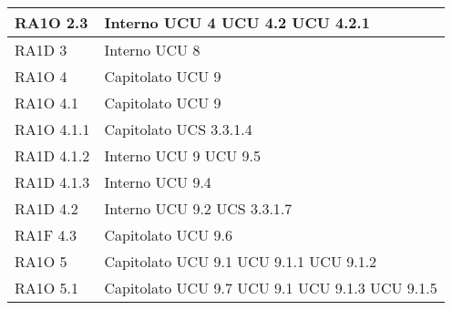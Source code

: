 \begin{center}
\begin{longtable}{ | p{5cm} | p{5cm} |}
        RA1O 2.3 &  Interno \newline  UCU 4 \newline  UCU 4.2 \newline  UCU 4.2.1 \newline  \\ \hline      
        RA1D 3 &  Interno \newline  UCU 8 \newline  \\ \hline      
        RA1O 4 &  Capitolato \newline  UCU 9 \newline  \\ \hline      
        RA1O 4.1 &  Capitolato \newline  UCU 9 \newline  \\ \hline      
        RA1O 4.1.1 &  Capitolato \newline  UCS 3.3.1.4 \newline  \\ \hline      
        RA1D 4.1.2 &  Interno \newline  UCU 9 \newline  UCU 9.5 \newline  \\ \hline      
        RA1D 4.1.3 &  Interno \newline  UCU 9.4 \newline  \\ \hline      
        RA1D 4.2 &  Interno \newline  UCU 9.2 \newline  UCS 3.3.1.7 \newline  \\ \hline      
        RA1F 4.3 &  Capitolato \newline  UCU 9.6 \newline  \\ \hline         
        RA1O 5 &  Capitolato \newline  UCU 9.1 \newline  UCU 9.1.1 \newline  UCU 9.1.2 \newline  \\ \hline      
        RA1O 5.1 &  Capitolato \newline  UCU 9.7 \newline  UCU 9.1 \newline  UCU 9.1.3 \newline  UCU 9.1.5 \newline  \\ \hline      

\end{longtable}
\end{center}
